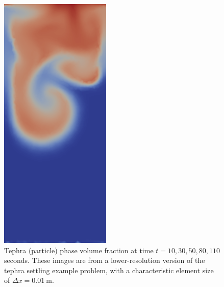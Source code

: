\begin{figure}[H]
	      \includegraphics[width=0.19\columnwidth]{./examples_images/tephra_settling/tephra_coarse_5.png}
   \caption{Tephra (particle) phase volume fraction at time $t = 10, 30, 50, 80, 110$ seconds. These images are from a lower-resolution version of the tephra settling example problem, with a characteristic element size of $\Delta x = 0.01\ \mathrm{m}$.}
   \label{fig:tephra_settling_coarse}
\end{figure}

